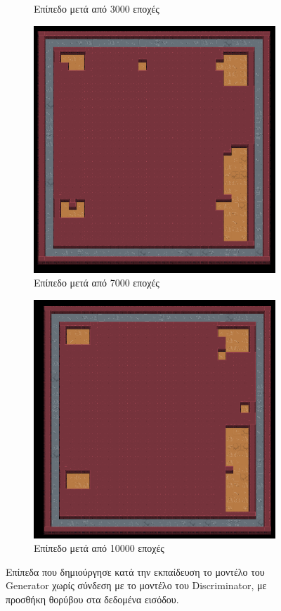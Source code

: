 \begin{figure}[H]
\begin{subfigure}{.5\textwidth}
  \caption{Επίπεδο μετά από 3000 εποχές}
  \label{fig:sfig2}
\end{subfigure}
\begin{subfigure}{.5\textwidth}
  \centering
  \includegraphics[width=.8\linewidth]{../images/result_images/cnn-gan-with-fuzzy/generator_7000.png}
  \caption{Επίπεδο μετά από 7000 εποχές}
  \label{fig:sfig2}
\end{subfigure}
\begin{subfigure}{.5\textwidth}
  \centering
  \includegraphics[width=.8\linewidth]{../images/result_images/cnn-gan-with-fuzzy/generator_10000.png}
  \caption{Επίπεδο μετά από 10000 εποχές}
  \label{fig:sfig2}
\end{subfigure}
\caption{Επίπεδα που δημιούργησε κατά την εκπαίδευση το μοντέλο του Generator χωρίς σύνδεση με το μοντέλο του Discriminator, με προσθήκη θορύβου στα δεδομένα εισόδου.}
\label{fig:fig}
\end{figure}

